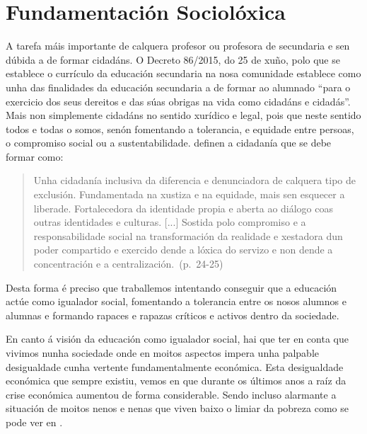 
\section{Fundamentación Sociolóxica}

A tarefa máis importante de calquera profesor ou profesora de secundaria e sen dúbida a de formar cidadáns. O Decreto 86/2015, do 25 de xuño, polo que se establece o currículo da educación secundaria na nosa comunidade establece como unha das finalidades da educación secundaria a de formar ao alumnado ``para o exercicio dos seus dereitos e das súas obrigas na vida como cidadáns e cidadás''. Mais non simplemente cidadáns no sentido xurídico e legal, pois que neste sentido todos e todas o somos, senón fomentando a tolerancia, e equidade entre persoas, o compromiso social ou a sustentabilidade.  definen a cidadanía que se debe formar como:

\begin{quote}
    \vspace{-0.5\baselineskip}
    Unha cidadanía inclusiva da diferencia e denunciadora de calquera tipo de exclusión. Fundamentada na xustiza e na equidade, mais sen esquecer a liberade. Fortalecedora da identidade propia e aberta ao diálogo coas outras identidades e culturas. [...] Sostida polo compromiso e a responsabilidade social na transformación da realidade e xestadora dun poder compartido e exercido dende a lóxica do servizo e non dende a concentración e a centralización.~(p.~24-25)
    \vspace{-0.6\baselineskip}
\end{quote}

Desta forma é preciso que traballemos intentando conseguir que a educación actúe como igualador social, fomentando a tolerancia entre os nosos alumnos e alumnas e formando rapaces e rapazas críticos e activos dentro da sociedade.

En canto á visión da educación como igualador social, hai que ter en conta que vivimos nunha sociedade onde en moitos aspectos impera unha palpable desigualdade cunha vertente fundamentalmente económica. Esta desigualdade económica que sempre existiu, vemos en  que durante os últimos anos a raíz da crise económica aumentou de forma considerable. Sendo incluso alarmante a situación de moitos nenos e nenas que viven baixo o limiar da pobreza como se pode ver en .

